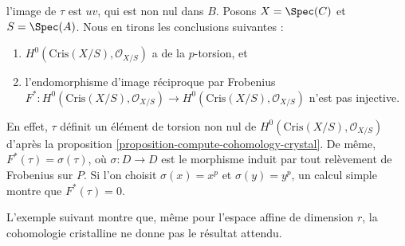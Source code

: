 \begin{example}
l'image de $\tau$ est $uv$, qui est non nul dans $B$.
Posons $X = \Spec(C)$ et $S = \Spec(A)$.
Nous en tirons les conclusions suivantes :
\begin{enumerate}
\item $H^0(\text{Cris}(X/S), \mathcal{O}_{X/S})$ a de la $p$-torsion, et
\item l'endomorphisme d'image réciproque par Frobenius $F^* : H^0(\text{Cris}(X/S), \mathcal{O}_{X/S})
\to H^0(\text{Cris}(X/S), \mathcal{O}_{X/S})$ n'est pas injective.
\end{enumerate}
En effet, $\tau$ définit un élément de torsion non nul de
$H^0(\text{Cris}(X/S), \mathcal{O}_{X/S})$ d'après la
proposition \ref{proposition-compute-cohomology-crystal}.
De même, $F^*(\tau) = \sigma(\tau)$, où $\sigma : D \to D$ est le
morphisme induit par tout relèvement de Frobenius sur $P$. Si l'on choisit $\sigma(x) = x^p$
et $\sigma(y) = y^p$, un calcul simple montre que $F^*(\tau) = 0$.
\end{example}

\noindent
L'exemple suivant montre que, même pour l'espace affine de dimension $r$, la cohomologie
cristalline ne donne pas le résultat attendu.

